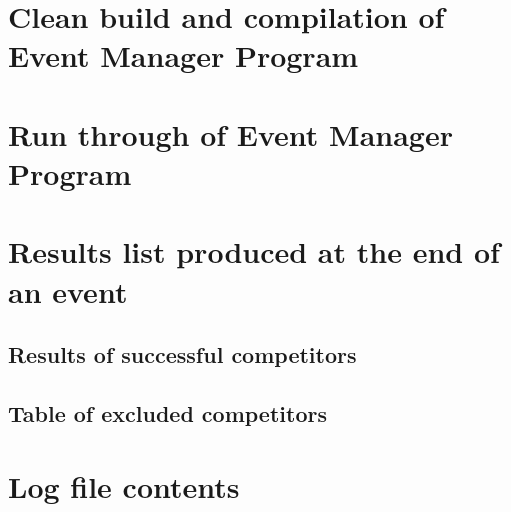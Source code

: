 \documentclass[a4paper,12pt]{article}
\begin{document}
\section{Clean build and compilation of Event Manager Program}


\begin{landscape}
\section{Run through of Event Manager Program}


\section{Results list produced at the end of an event}

\subsection{Results of successful competitors}


\subsection{Table of excluded competitors}


\section{Log file contents}


\end{landscape}
\end{document}
